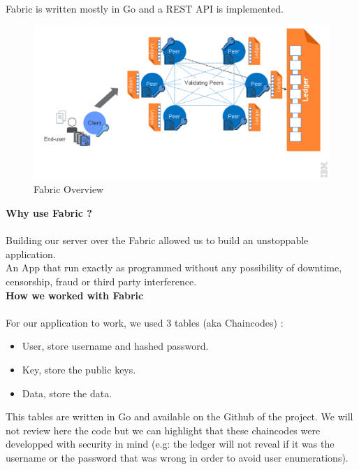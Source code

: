  			\paragraph{}
			Fabric is written mostly in Go and a REST API is implemented.
			
			 \begin{figure}[H]
	    		 \centering
	     		 \includegraphics[width=14cm]{images/Fabric/Fabric}
	     		 \caption{Fabric Overview}
	   		\end{figure}
			
			 \textbf{Why use Fabric ?}
			 \paragraph{}
			 Building our server over the Fabric allowed us to build an unstoppable application.\\An App that run exactly as programmed without any possibility of downtime, censorship, fraud or third party interference.\\
			 
			  \textbf{How we worked with Fabric}
			   \paragraph{}
			 For our application to work, we used 3 tables (aka Chaincodes) : 
 			\begin{itemize}
 			\item User, store username and hashed password.
 			\item Key, store the public keys.
 			\item Data, store the data.
 			\end{itemize}
 			This tables are written in Go and available on the Github of the project. We will not review here the code but we can highlight that these chaincodes were developped with security in mind (e.g: the ledger will not reveal if it was the username or the password that was wrong in order to avoid user enumerations).
